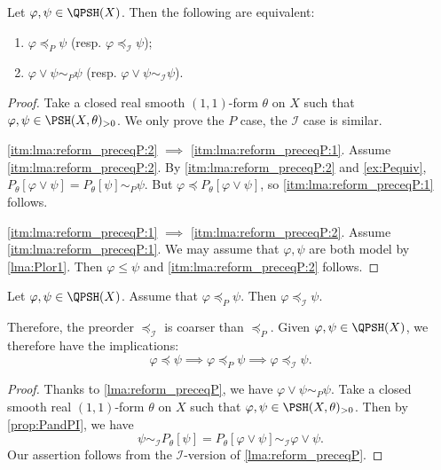 \begin{lemma}\label{lma:reform_preceqP}
    Let $\varphi,\psi\in \QPSH(X)$. Then the following are equivalent:
    \begin{enumerate}
        \item\label{itm:lma:reform_preceqP:1} $\varphi\preceq_P \psi$ (resp. $\varphi\preceq_{\mathcal{I}} \psi$);
        \item\label{itm:lma:reform_preceqP:2} $\varphi\lor \psi\sim_P\psi$ (resp. $\varphi\lor \psi\sim_{\mathcal{I}}\psi$).
    \end{enumerate}
\end{lemma}
\begin{proof}
Take a closed real smooth $(1,1)$-form $\theta$ on $X$ such that $\varphi,\psi\in \PSH(X,\theta)_{>0}$. We only prove the $P$ case, the $\mathcal{I}$ case is similar.

\ref{itm:lma:reform_preceqP:2} $\implies$ \ref{itm:lma:reform_preceqP:1}. Assume \ref{itm:lma:reform_preceqP:2}. By \ref{itm:lma:reform_preceqP:2} and \cref{ex:Pequiv}, $P_{\theta}[\varphi\lor \psi]=P_{\theta}[\psi]\sim_P \psi$. But $\varphi\preceq P_{\theta}[\varphi\lor \psi]$, so \ref{itm:lma:reform_preceqP:1} follows.

\ref{itm:lma:reform_preceqP:1} $\implies$ \ref{itm:lma:reform_preceqP:2}. Assume \ref{itm:lma:reform_preceqP:1}. We may assume that $\varphi,\psi$ are both model by \cref{lma:Plor1}.
    Then $\varphi\leq \psi$ and \ref{itm:lma:reform_preceqP:2} follows.
\end{proof}

\begin{corollary}\label{cor:PimpliesI}
    Let $\varphi,\psi \in \QPSH(X)$. Assume that $\varphi\preceq_P \psi$. Then $\varphi\preceq_{\mathcal{I}}\psi$.
\end{corollary}
Therefore, the preorder $\preceq_{\mathcal{I}}$ is coarser than $\preceq_P$. Given $\varphi,\psi\in \QPSH(X)$, we therefore have the implications:
\[
\varphi\preceq \psi \implies \varphi\preceq_P \psi \implies \varphi\preceq_{\mathcal{I}} \psi.
\]
\begin{proof}
    Thanks to \cref{lma:reform_preceqP}, we have $\varphi\lor \psi\sim_P \psi$. Take a closed smooth real $(1,1)$-form $\theta$ on $X$ such that $\varphi,\psi\in \PSH(X,\theta)_{>0}$.
    Then by \cref{prop:PandPI}, we have
    \[
        \psi\sim_{\mathcal{I}} P_{\theta}[\psi]= P_{\theta}\left[\varphi\lor \psi\right]\sim_{\mathcal{I}} \varphi\lor \psi.
    \]
    Our assertion follows from the $\mathcal{I}$-version of \cref{lma:reform_preceqP}.
\end{proof}

